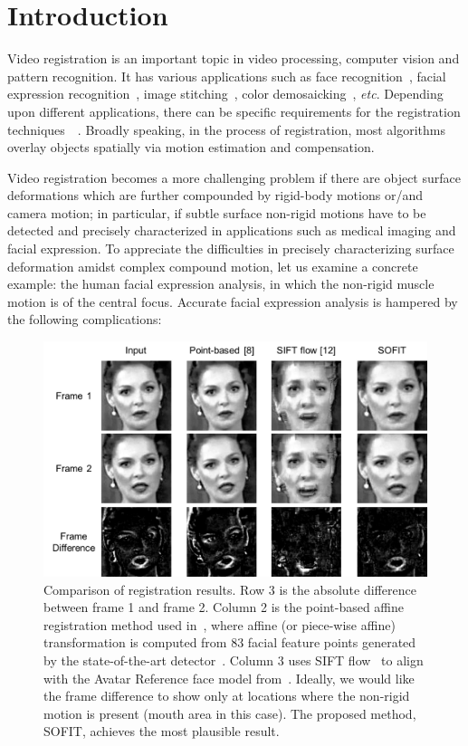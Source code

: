 \documentclass[review]{elsarticle}
\begin{document}
\linenumbers

\section{Introduction\label{sec:intro}}

Video registration is an important topic in video processing, computer vision and pattern recognition. It has various applications such as face recognition~\cite{Wagner2009}, facial expression recognition~\cite{Valstar12}, image stitching~\cite{Szeliski06}, color demosaicking~\cite{Wu_TIP06}, \textit{etc}. Depending upon different applications, there can be specific requirements for the registration techniques~\cite{Uenohara95}~\cite{Caspi_PAMI02}. Broadly speaking, in the process of registration, most algorithms overlay objects spatially via motion estimation and compensation. 

Video registration becomes a more challenging problem if there are object surface deformations which are further compounded by rigid-body motions or/and camera motion; in particular, if subtle surface non-rigid motions have to be detected and precisely characterized in applications such as medical imaging and facial expression. To appreciate the difficulties in precisely characterizing surface deformation amidst complex compound motion, let us examine a concrete example: the human facial expression analysis, in which the non-rigid muscle motion is of the central focus.  Accurate facial expression analysis is hampered by the following complications:

\begin{figure}[!t]
	\centering
	\includegraphics[width=\columnwidth]{fig/regComp.png}
	\caption{Comparison of registration results. Row 3 is the absolute difference between frame 1 and frame 2. Column 2 is the point-based affine registration method used in~\cite{Littlewort_CERT_FG2011,Tadas_ECCV14,Valstar_SMCB12,IntraFace,McDuff_TAC14}, where affine (or piece-wise affine) transformation is computed from 83 facial feature points generated by the state-of-the-art detector~\cite{Tadas_ECCV14}. Column 3 uses SIFT flow~\cite{Liu_PAMI11} to align with the Avatar Reference face model from~\cite{Yang_SMCB12}. Ideally, we would like the frame difference to show only at locations where the non-rigid motion is present (mouth area in this case). The proposed method, SOFIT, achieves the most plausible result.}
	\label{fig:regComp}
\end{figure}
\end{document}
